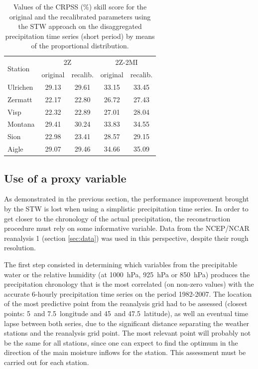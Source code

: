 \documentclass[hess]{copernicus}
\begin{document}
\begin{table}[htb]
	\caption{Values of the CRPSS (\%) skill score for the original and the recalibrated parameters using the STW approach on the disaggregated precipitation time series (short period) by means of the proportional distribution.}
	\begin{center}
		\begin{tabular}{l c c c c}
			\hline
			\multirow{2}{*}{Station} & \multicolumn{2}{c}{2Z} & \multicolumn{ 2}{c}{2Z-2MI} \\
			& original & recalib. & original & recalib. \\
			\hline
			Ulrichen & 29.13 & 29.61 & 33.15 & 33.45 \\
			Zermatt & 22.17 & 22.80 & 26.72 & 27.43 \\
			Visp & 22.32 & 22.89 & 27.01 & 28.04 \\
			Montana & 29.41 & 30.24 & 33.83 & 34.55 \\
			Sion & 22.98 & 23.41 & 28.57 & 29.15 \\
			Aigle & 29.07 & 29.46 & 34.66 & 35.09 \\
			\hline
		\end{tabular}
	\end{center}
	\label{table:disaggregation_proportional}
\end{table}


\subsection{Use of a proxy variable}

As demonstrated in the previous section, the performance improvement brought by the STW is lost when using a simplistic precipitation time series. In order to get closer to the chronology of the actual precipitation, the reconstruction procedure must rely on some informative variable. Data from the NCEP/NCAR reanalysis 1 (section \ref{sec:data}) was used in this perspective, despite their rough resolution. 

The first step consisted in determining which variables from the precipitable water or the relative humidity (at 1000~hPa, 925~hPa or 850~hPa) produces the precipitation chronology that is the most correlated (on non-zero values) with the accurate 6-hourly precipitation time series on the period 1982-2007. The location of the most predictive point from the reanalysis grid had to be assessed (closest points: 5\textdegree\ and 7.5\textdegree\ longitude and 45\textdegree\ and 47.5\textdegree\ latitude), as well an eventual time lapse between both series, due to the significant distance separating the weather stations and the reanalysis grid point. The most relevant point will probably not be the same for all stations, since one can expect to find the optimum in the direction of the main moisture inflows for the station. This assessment must be carried out for each station. 
\end{document}
